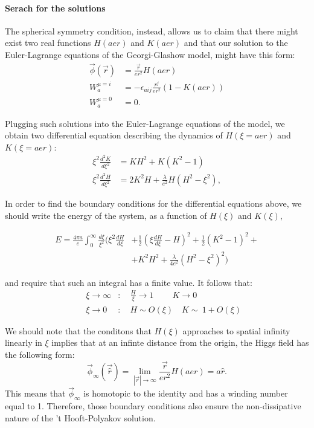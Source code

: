    \paragraph{Serach for the solutions}The spherical symmetry condition, instead, allows us to claim that there might exist two real functions $H(aer)$ and $K(aer)$ and that our solution to the Euler-Lagrange equations of the Georgi-Glashow model, might have this form: 
  \begin{align}
      \vec{\phi}(\vec{r}) &= \frac{\vec{r}}{er^2}H(aer) \\ 
      W^{\mu =i}_{a} &= - \epsilon_{aij}\frac{r^j}{er^2}(1 - K(aer)) \\
      W^{\mu=0}_{a}&=0. 
  \end{align}
  
  Plugging such solutions into the Euler-Lagrange equations of the model, we obtain two differential equation describing the dynamics of $H(\xi = aer)$ and $K(\xi = aer)$: 
  \begin{align}
  \xi ^2 \frac{d^2 K}{d \xi^2} &= KH^2 + K(K^2-1)   \label{eq:H}\\
  \xi ^2 \frac{d^2 H}{d \xi^2} &= 2K^2H + \frac{\lambda}{e^2}H (H^2 -\xi^2), \label{eq:K}
  \end{align}
  
  In order to find the boundary conditions for the differential equations above, we should write the energy of the system, as a function of $H(\xi)$ and $K(\xi)$,

  \begin{equation}
  \begin{split}
  E = \frac{4 \pi a}{e} \int_{0}^{\infty} \frac{d \xi}{\xi^2}  \bigr( \xi^2\frac{dH}{d\xi}  &+  \frac{1}{2}\left( \xi \frac{dH}{d\xi} -H \right)^2  +  
  \frac{1}{2} \left( K^2 - 1 \right)^2 +  \\
  & +K^2 H^2 + \frac{\lambda}{4e^2} \left( H^2-\xi^2\right)^2   \bigr)
  \end{split}
  \end{equation}
  
  and require that such an integral has a finite value. It follows that: 
  \begin{align}
 && \xi \to \infty &\colon  \quad \frac{H}{\xi} \to 1 \qquad \ K \to 0     \label{eq:bound1}\\
 && \xi  \to 0      &\colon  \quad H \sim  O(\xi)     \quad K \sim \ 1 + O(\xi)  \label{eq:bound2}
  \end{align}
 
 We should note that the conditons that $H(\xi)$ approaches to spatial infinity linearly in $\xi$ implies that at an infinte distance from the origin, the Higgs field has the following form: 
 \begin{equation}
 \vec{\phi}_{\infty}(\vec{\hat{r}}) = \lim_{|\vec{r}| \to \infty } \frac{\vec{r}}{er^2}H(aer) = a \hat{r}.
 \end{equation}
 This means that $\vec{\phi}_{\infty}$ is homotopic to the identity and has a winding number equal to 1. Therefore, those boundary conditions also ensure the non-dissipative nature of the  't Hooft-Polyakov solution.
 
